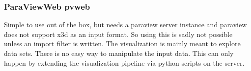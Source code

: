 \subsubsection{ParaViewWeb pvweb}
\label{paraviewweb-pvweb}

Simple to use out of the box, but needs a paraview server instance and
paraview does not support x3d as an input format. So using this is sadly
not possible unless an import filter is written. The visualization is
mainly meant to explore data sets. There is no easy way to manipulate
the input data. This can only happen by extending the visualization
pipeline via python scripts on the server.
